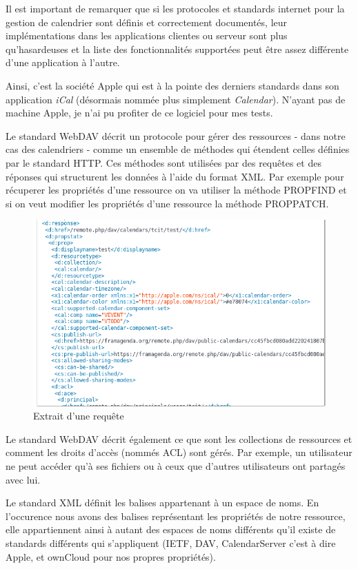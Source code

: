 \documentclass[10pt,a4paper, twoside]{report}
\begin{document}
	Il est important de remarquer que si les protocoles et standards internet pour la gestion de calendrier sont définis et correctement documentés, leur implémentations dans les applications clientes ou serveur sont plus qu'hasardeuses et la liste des fonctionnalités supportées peut être assez différente d'une application à l'autre.
	
	Ainsi, c'est la société Apple qui est à la pointe des derniers standards dans son application \textit{iCal} (désormais nommée plus simplement \textit{Calendar}). N'ayant pas de machine Apple, je n'ai pu profiter de ce logiciel pour mes tests.
	
	Le standard WebDAV décrit un protocole pour gérer des ressources - dans notre cas des calendriers - comme un ensemble de méthodes qui étendent celles définies par le standard HTTP. Ces méthodes sont utilisées par des requêtes et des réponses qui structurent les données à l'aide du format XML. Par exemple pour récuperer les propriétés d'une ressource on va utiliser la méthode PROPFIND et si on veut modifier les propriétés d'une ressource la méthode PROPPATCH.
	
	\begin{figure}[ht]
		\centering
		\includegraphics[width=1\textwidth]{images/requete-xml.png}
		\caption*{Extrait d'une requête}
		\label{normal_case}
	\end{figure}
	
	Le standard WebDAV décrit également ce que sont les collections de ressources et comment les droits d'accès (nommés ACL) sont gérés. Par exemple, un utilisateur ne peut accéder qu'à ses fichiers ou à ceux que d'autres utilisateurs ont partagés avec lui.
	
	Le standard XML définit les balises appartenant à un espace de noms. En l'occurence nous avons des balises représentant les propriétés de notre ressource, elle appartiennent ainsi à autant des espaces de noms différents qu'il existe de standards différents qui s'appliquent (IETF, DAV, CalendarServer c'est à dire Apple, et ownCloud pour nos propres propriétés).
	
\end{document}
